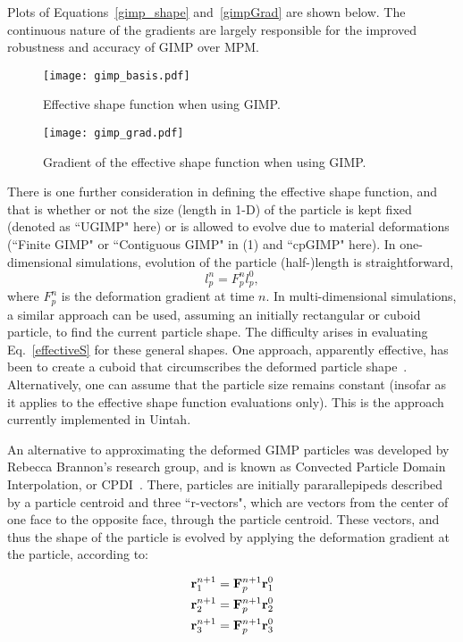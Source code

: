 Plots of Equations~\ref{gimp_shape} and~\ref{gimpGrad} are shown
below.  The continuous nature of the gradients are largely responsible
for the improved robustness and accuracy of GIMP over MPM.

\begin{figure}
  \texttt{[image: gimp\_basis.pdf]}
  \caption{Effective shape function when using GIMP.}
  \label{Fig:GIMP}
\end{figure}

\begin{figure}
  \texttt{[image: gimp\_grad.pdf]}
  \caption{Gradient of the effective shape function when using GIMP.}
  \label{Fig:GradGIMP}
\end{figure}
%
There is one further consideration in defining the effective shape function,
and that is whether or not the size (length in 1-D) of the particle is kept
fixed (denoted as ``UGIMP" here)
or is allowed to evolve due to material deformations 
(``Finite GIMP" or ``Contiguous GIMP" in (1) and ``cpGIMP" here).
In one-dimensional
simulations, evolution of the particle (half-)length is straightforward,
\begin{equation}
l_p^n = F_p^n l_p^0 ,  \label{particle_length}
\end{equation} 
where $F_p^n$ is the deformation gradient at time $n$.
In multi-dimensional simulations, a similar approach can be used, assuming
an initially rectangular or cuboid particle, to find the current particle
shape.  The difficulty arises in evaluating Eq.~\ref{effectiveS} for
these general shapes.  One approach, apparently effective, has been to create
a cuboid that circumscribes the deformed particle shape~\cite{jinmaCMES2006}.
Alternatively, one can assume that the particle size remains constant (insofar
as it applies to the effective shape function evaluations only).  This is
the approach currently implemented in Uintah.

An alternative to approximating the deformed GIMP particles was developed by
Rebecca Brannon's research group, and is known as Convected Particle Domain
Interpolation, or CPDI~\cite{CPDI_paper}.  There, particles are initially
pararallepipeds described by a particle centroid and three ``r-vectors",
which are vectors from the center of one face to the opposite face, through the
particle centroid.
These vectors, and thus the shape of the particle is evolved by applying the
deformation gradient at the particle, according to:

\begin{eqnarray}
{\bf r}_1^{n+1} = {\bf F}_p^{n+1} {\bf r}_1^0 \\
{\bf r}_2^{n+1} = {\bf F}_p^{n+1} {\bf r}_2^0 \\
{\bf r}_3^{n+1} = {\bf F}_p^{n+1} {\bf r}_3^0 \\
\label{r_vector_evolution}
\end{eqnarray} 

